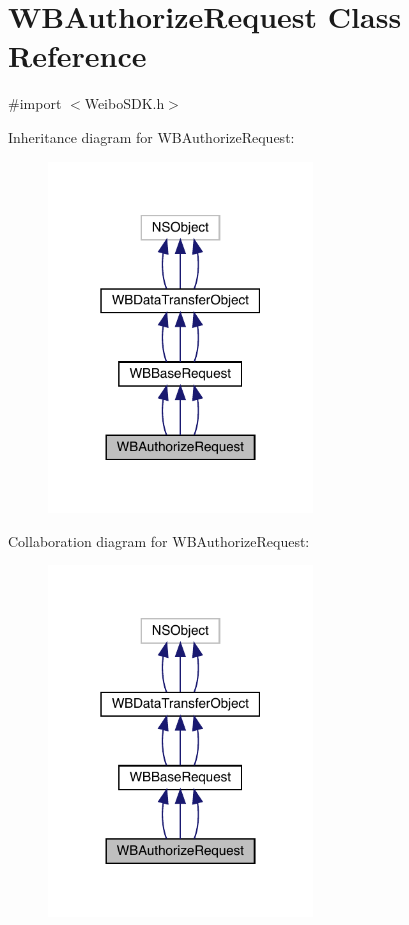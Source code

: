 \hypertarget{interface_w_b_authorize_request}{}\section{W\+B\+Authorize\+Request Class Reference}
\label{interface_w_b_authorize_request}


{\ttfamily \#import $<$Weibo\+S\+D\+K.\+h$>$}



Inheritance diagram for W\+B\+Authorize\+Request\+:\nopagebreak
\begin{figure}[H]
\begin{center}
\leavevmode
\includegraphics[width=199pt]{interface_w_b_authorize_request__inherit__graph}
\end{center}
\end{figure}


Collaboration diagram for W\+B\+Authorize\+Request\+:\nopagebreak
\begin{figure}[H]
\begin{center}
\leavevmode
\includegraphics[width=199pt]{interface_w_b_authorize_request__coll__graph}
\end{center}
\end{figure}
